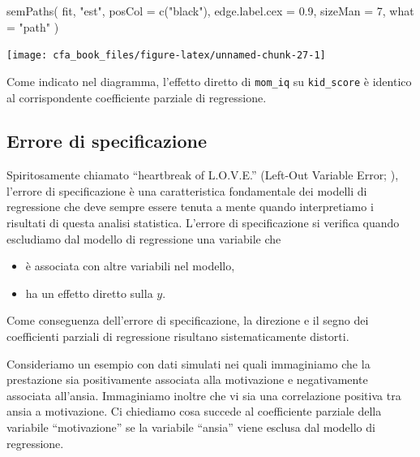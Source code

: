 \documentclass[
  11pt,
]{krantz}
\makeatletter
\newenvironment{Shaded}{\begin{snugshade}}{\end{snugshade}}
\newcommand{\AttributeTok}[1]{\textcolor[rgb]{0.61,0.61,0.61}{#1}}
\newcommand{\DecValTok}[1]{\textcolor[rgb]{0.06,0.06,0.06}{#1}}
\newcommand{\FloatTok}[1]{\textcolor[rgb]{0.06,0.06,0.06}{#1}}
\newcommand{\FunctionTok}[1]{\textcolor[rgb]{0,0,0}{#1}}
\newcommand{\NormalTok}[1]{#1}
\newcommand{\StringTok}[1]{\textcolor[rgb]{0.5,0.5,0.5}{#1}}
\providecommand{\tightlist}{%
  \setlength{\itemsep}{0pt}\setlength{\parskip}{0pt}}
\newenvironment{kframe}{%
\medskip{}
\setlength{\fboxsep}{.8em}
 \def\at@end@of@kframe{}%
 \ifinner\ifhmode%
  \def\at@end@of@kframe{\end{minipage}}%
  \begin{minipage}{\columnwidth}%
 \fi\fi%
 \def\FrameCommand##1{\hskip\@totalleftmargin \hskip-\fboxsep
 \colorbox{shadecolor}{##1}\hskip-\fboxsep
     \hskip-\linewidth \hskip-\@totalleftmargin \hskip\columnwidth}%
 \MakeFramed {\advance\hsize-\width
   \@totalleftmargin\z@ \linewidth\hsize
   \@setminipage}}%
 {\par\unskip\endMakeFramed%
 \at@end@of@kframe}
\renewenvironment{Shaded}{\begin{kframe}}{\end{kframe}}
\makeatother
\begin{document}
\begin{Shaded}
\begin{Highlighting}[]
\FunctionTok{semPaths}\NormalTok{(}
\NormalTok{  fit, }\StringTok{"est"}\NormalTok{,}
  \AttributeTok{posCol =} \FunctionTok{c}\NormalTok{(}\StringTok{"black"}\NormalTok{),}
  \AttributeTok{edge.label.cex =} \FloatTok{0.9}\NormalTok{,}
  \AttributeTok{sizeMan =} \DecValTok{7}\NormalTok{,}
  \AttributeTok{what =} \StringTok{"path"}
\NormalTok{)}
\end{Highlighting}
\end{Shaded}

\begin{center}\texttt{[image: cfa\_book\_files/figure-latex/unnamed-chunk-27-1]} \end{center}

Come indicato nel diagramma, l'effetto diretto di \texttt{mom\_iq} su \texttt{kid\_score} è identico al corrispondente coefficiente parziale di regressione.

\hypertarget{errore-di-specificazione}{%
\subsection{Errore di specificazione}\label{errore-di-specificazione}}

Spiritosamente chiamato ``heartbreak of L.O.V.E.'' (Left-Out Variable Error; \citet{mauro1990understanding}), l'errore di specificazione è una caratteristica fondamentale dei modelli di regressione che deve sempre essere tenuta a mente quando interpretiamo i risultati di questa analisi statistica. L'errore di specificazione si verifica quando escludiamo dal modello di regressione una variabile che

\begin{itemize}
\tightlist
\item
  è associata con altre variabili nel modello,
\item
  ha un effetto diretto sulla \(y\).
\end{itemize}

Come conseguenza dell'errore di specificazione, la direzione e il segno dei coefficienti parziali di regressione risultano sistematicamente distorti.

Consideriamo un esempio con dati simulati nei quali immaginiamo che la prestazione sia positivamente associata alla motivazione e negativamente associata all'ansia. Immaginiamo inoltre che vi sia una correlazione positiva tra ansia a motivazione. Ci chiediamo cosa succede al coefficiente parziale della variabile ``motivazione'' se la variabile ``ansia'' viene esclusa dal modello di regressione.
\end{document}
